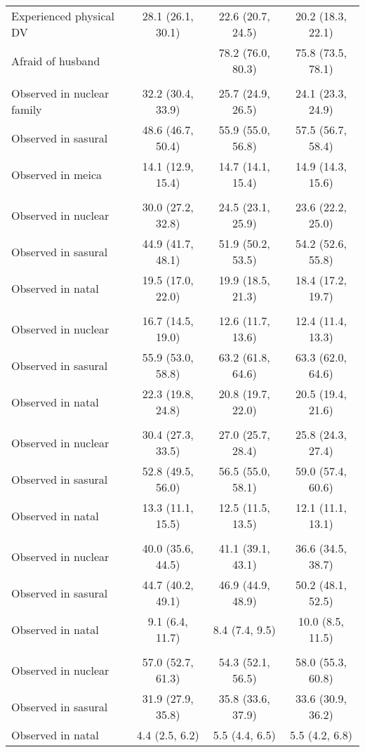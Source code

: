 \begin{tabular}{lccc}
Experienced physical DV&28.1 (26.1, 30.1)&22.6 (20.7, 24.5)&20.2 (18.3, 22.1)\\
Afraid of husband&&78.2 (76.0, 80.3)&75.8 (73.5, 78.1)\\
\textbf{Household structure (a&&&\\
Observed in nuclear family&32.2 (30.4, 33.9)&25.7 (24.9, 26.5)&24.1 (23.3, 24.9)\\
Observed in sasural&48.6 (46.7, 50.4)&55.9 (55.0, 56.8)&57.5 (56.7, 58.4)\\
Observed in meica&14.1 (12.9, 15.4)&14.7 (14.1, 15.4)&14.9 (14.3, 15.6)\\
\textbf{Household structure: 8&&&\\
Observed in nuclear&30.0 (27.2, 32.8)&24.5 (23.1, 25.9)&23.6 (22.2, 25.0)\\
Observed in sasural&44.9 (41.7, 48.1)&51.9 (50.2, 53.5)&54.2 (52.6, 55.8)\\
Observed in natal&19.5 (17.0, 22.0)&19.9 (18.5, 21.3)&18.4 (17.2, 19.7)\\
\textbf{Household structure: p&&&\\
Observed in nuclear&16.7 (14.5, 19.0)&12.6 (11.7, 13.6)&12.4 (11.4, 13.3)\\
Observed in sasural&55.9 (53.0, 58.8)&63.2 (61.8, 64.6)&63.3 (62.0, 64.6)\\
Observed in natal&22.3 (19.8, 24.8)&20.8 (19.7, 22.0)&20.5 (19.4, 21.6)\\
\textbf{Household structure: p&&&\\
Observed in nuclear&30.4 (27.3, 33.5)&27.0 (25.7, 28.4)&25.8 (24.3, 27.4)\\
Observed in sasural&52.8 (49.5, 56.0)&56.5 (55.0, 58.1)&59.0 (57.4, 60.6)\\
Observed in natal&13.3 (11.1, 15.5)&12.5 (11.5, 13.5)&12.1 (11.1, 13.1)\\
\textbf{Household structure: 8&&&\\
Observed in nuclear&40.0 (35.6, 44.5)&41.1 (39.1, 43.1)&36.6 (34.5, 38.7)\\
Observed in sasural&44.7 (40.2, 49.1)&46.9 (44.9, 48.9)&50.2 (48.1, 52.5)\\
Observed in natal&9.1 (6.4, 11.7)&8.4 (7.4, 9.5)&10.0 (8.5, 11.5)\\
\textbf{Household structure: p&&&\\
Observed in nuclear&57.0 (52.7, 61.3)&54.3 (52.1, 56.5)&58.0 (55.3, 60.8)\\
Observed in sasural&31.9 (27.9, 35.8)&35.8 (33.6, 37.9)&33.6 (30.9, 36.2)\\
Observed in natal&4.4 (2.5, 6.2)&5.5 (4.4, 6.5)&5.5 (4.2, 6.8)\\
\bottomrule
\end{tabular}
